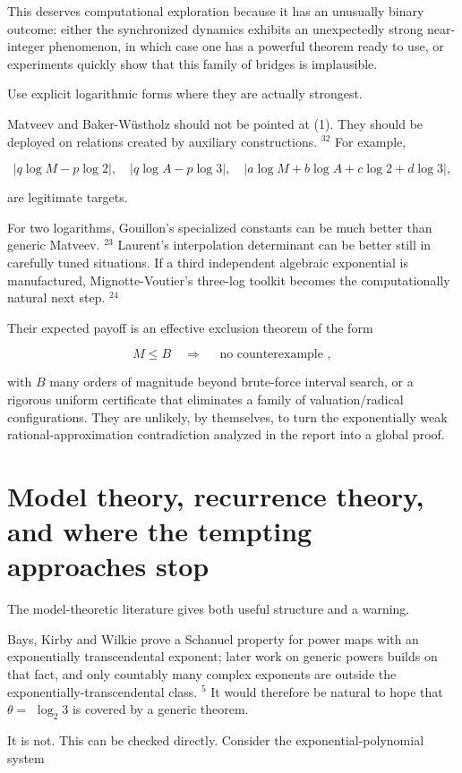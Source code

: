 \documentclass[10pt]{article}
\begin{document}
This deserves computational exploration because it has an unusually binary outcome: either the synchronized dynamics exhibits an unexpectedly strong near-integer phenomenon, in which case one has a powerful theorem ready to use, or experiments quickly show that this family of bridges is implausible.

Use explicit logarithmic forms where they are actually strongest.

Matveev and Baker-Wüstholz should not be pointed at (1). They should be deployed on relations created by auxiliary constructions. ${ }^{32}$ For example,

$$
|q \log M-p \log 2|, \quad|q \log A-p \log 3|, \quad|a \log M+b \log A+c \log 2+d \log 3|,
$$

are legitimate targets.

For two logarithms, Gouillon's specialized constants can be much better than generic Matveev. ${ }^{23}$ Laurent's interpolation determinant can be better still in carefully tuned situations. If a third independent algebraic exponential is manufactured, Mignotte-Voutier's three-log toolkit becomes the computationally natural next step. ${ }^{24}$

Their expected payoff is an effective exclusion theorem of the form

$$
M \leq B \quad \Longrightarrow \quad \text { no counterexample },
$$

with $B$ many orders of magnitude beyond brute-force interval search, or a rigorous uniform certificate that eliminates a family of valuation/radical configurations. They are unlikely, by themselves, to turn the exponentially weak rational-approximation contradiction analyzed in the report into a global proof.

\section*{Model theory, recurrence theory, and where the tempting approaches stop}
The model-theoretic literature gives both useful structure and a warning.

Bays, Kirby and Wilkie prove a Schanuel property for power maps with an exponentially transcendental exponent; later work on generic powers builds on that fact, and only countably many complex exponents are outside the exponentially-transcendental class. ${ }^{5}$ It would therefore be natural to hope that $\theta=$ $\log _{2} 3$ is covered by a generic theorem.

It is not. This can be checked directly. Consider the exponential-polynomial system
\end{document}
